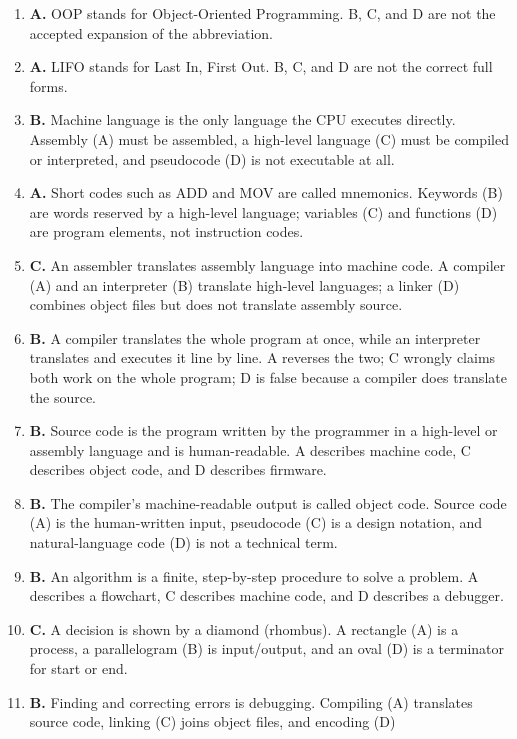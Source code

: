 \begin{enumerate}[label=\textbf{Q\arabic*.}, leftmargin=*]
\item \textbf{A.} OOP stands for Object-Oriented Programming. B, C, and D are
  not the accepted expansion of the abbreviation.
\item \textbf{A.} LIFO stands for Last In, First Out. B, C, and D are not the
  correct full forms.
\item \textbf{B.} Machine language is the only language the CPU executes
  directly. Assembly (A) must be assembled, a high-level language (C) must be
  compiled or interpreted, and pseudocode (D) is not executable at all.
\item \textbf{A.} Short codes such as ADD and MOV are called mnemonics.
  Keywords (B) are words reserved by a high-level language; variables (C) and
  functions (D) are program elements, not instruction codes.
\item \textbf{C.} An assembler translates assembly language into machine
  code. A compiler (A) and an interpreter (B) translate high-level
  languages; a linker (D) combines object files but does not translate
  assembly source.
\item \textbf{B.} A compiler translates the whole program at once, while an
  interpreter translates and executes it line by line. A reverses the two;
  C wrongly claims both work on the whole program; D is false because a
  compiler does translate the source.
\item \textbf{B.} Source code is the program written by the programmer in a
  high-level or assembly language and is human-readable. A describes machine
  code, C describes object code, and D describes firmware.
\item \textbf{B.} The compiler's machine-readable output is called object
  code. Source code (A) is the human-written input, pseudocode (C) is a
  design notation, and natural-language code (D) is not a technical term.
\item \textbf{B.} An algorithm is a finite, step-by-step procedure to solve a
  problem. A describes a flowchart, C describes machine code, and D describes
  a debugger.
\item \textbf{C.} A decision is shown by a diamond (rhombus). A rectangle (A)
  is a process, a parallelogram (B) is input/output, and an oval (D) is a
  terminator for start or end.
\item \textbf{B.} Finding and correcting errors is debugging. Compiling (A)
  translates source code, linking (C) joins object files, and encoding (D)

\end{enumerate}
